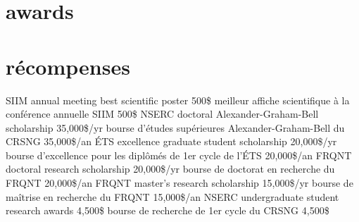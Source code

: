\documentclass[print]{friggeri-cv}
\begin{document}
\ifdefined\isenglish\section{awards}\else\section{récompenses}\fi

\begin{entrylist}
  \ifdefined\isenglish
     {{\small SIIM} annual meeting best scientific poster} {500\$} {\vspace{-3mm}}
  \else
     {meilleur affiche scientifique à la conférence annuelle {\small SIIM}} {500\$} {\vspace{-3mm}}
  \fi
  \ifdefined\isenglish
     {{\small NSERC} doctoral Alexander-Graham-Bell scholarship} {35,000\$/yr} {\vspace{-3mm}}
  \else
     {bourse d’études supérieures Alexander-Graham-Bell du {\small CRSNG}} {35,000\$/an} {\vspace{-3mm}}
  \fi
  \ifdefined\isenglish
     {{\small ÉTS} excellence graduate student scholarship} {20,000\$/yr} {\vspace{-3mm}}
  \else
     {bourse d'excellence pour les diplômés de 1er cycle de l'ÉTS} {20,000\$/an} {\vspace{-3mm}}
  \fi
  \ifdefined\isenglish
     {{\small FRQNT} doctoral research scholarship} {20,000\$/yr} {\vspace{-3mm}}
  \else
     {bourse de doctorat en recherche du {\small FRQNT}} {20,000\$/an} {\vspace{-3mm}}
  \fi
  \ifdefined\isenglish
     {{\small FRQNT} master's research scholarship} {15,000\$/yr} {\vspace{-3mm}}
  \else
     {bourse de maîtrise en recherche du {\small FRQNT}} {15,000\$/an} {\vspace{-3mm}}
  \fi
  \ifdefined\isenglish
     {{\small NSERC} undergraduate student research awards} {4,500\$} {\vspace{-3mm}}
  \else
     {bourse de recherche de 1er cycle du {\small CRSNG}} {4,500\$} {\vspace{-3mm}}
  \fi
\end{entrylist}
\end{document}
